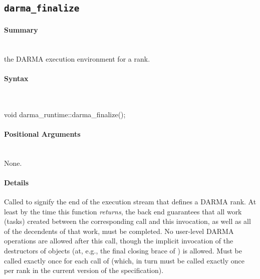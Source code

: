 
\subsection{\texttt{darma\_finalize}}
\label{ssec:api_fe_finalize}

\paragraph{Summary}\mbox{}\\
 the \gls{DARMA} execution environment for a \gls{rank}.

\paragraph{Syntax}\mbox{}\\ 
\begin{CppCode}
void darma_runtime::darma_finalize();
\end{CppCode}

\paragraph{Positional Arguments}\mbox{} \\
None. 

\paragraph{Details}\mbox{} 
Called to signify the end of the \gls{execution stream} that defines a
\gls{DARMA} \gls{rank}.  At least by the time this function {\em returns}, the  back end guarantees that all work
(\glspl{task}) created between the corresponding  call and this
invocation, as well as all of the decendents of that work, must be
completed.  No user-level \gls{DARMA} operations are allowed after this call, though
the implicit invocation of the destructors of  objects
(at, e.g., the final closing brace of ) is allowed.  Must
be called exactly once for each call of  (which, in turn
must be called exactly once per \gls{rank} in the current version of the
specification).

